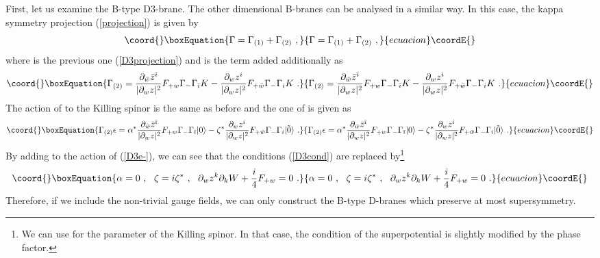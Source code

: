 \documentclass[a4paper,12pt]{article}
\numberwithin{equation}{section}
\providecommand{\ib}{\bar{\imath}}
\providecommand{\wb}{\bar{w}}
\providecommand{\zb}{\bar{z}}
\providecommand{\vac}{|0\rangle}
\providecommand{\vact}{|\tilde 0\rangle}
\begin{document}
First, let us examine the B-type D3-brane. The other dimensional B-branes
can be analysed in a similar way.
In this case, the kappa symmetry projection (\ref{projection}) is
given by 
\begin{equation}\coord{}\boxEquation{
\Gamma = \Gamma_{(1)} + \Gamma_{(2)} ~,
}{
\Gamma = \Gamma_{(1)} + \Gamma_{(2)} ~,
}{ecuacion}\coordE{}\end{equation}
where \coordHE{} is the previous one (\ref{D3projection})
and \coordHE{} is the term added additionally as
\begin{equation}\coord{}\boxEquation{
 \Gamma_{(2)} =  \frac{\partial_{\wb} \zb^{\ib}}
               {|\partial _w z|^2} F_{+ w} \Gamma_- \Gamma_{\ib}K
        - \frac{\partial_w z^i}
               {|\partial _w z|^2} F_{+\wb} \Gamma_- \Gamma_i K ~. 
}{
 \Gamma_{(2)} =  \frac{\partial_{\wb} \zb^{\ib}}
               {|\partial _w z|^2} F_{+ w} \Gamma_- \Gamma_{\ib}K
        - \frac{\partial_w z^i}
               {|\partial _w z|^2} F_{+\wb} \Gamma_- \Gamma_i K ~. 
}{ecuacion}\coordE{}\end{equation}
The action of \coordHE{} to the Killing spinor is the same as before
and the one of \coordHE{} is given as
\begin{equation}\coord{}\boxEquation{
 \Gamma_{(2)} \epsilon  = 
  \alpha^* \frac{\partial_{\wb} \zb^{\ib}}
               {|\partial _w z|^2} F_{+ w} \Gamma_- \Gamma_{\ib} \vac
 - \zeta^* \frac{\partial_w z^i}
               {|\partial _w z|^2} F_{+\wb} \Gamma_- \Gamma_i \vact ~.
}{
 \Gamma_{(2)} \epsilon  = 
  \alpha^* \frac{\partial_{\wb} \zb^{\ib}}
               {|\partial _w z|^2} F_{+ w} \Gamma_- \Gamma_{\ib} \vac
 - \zeta^* \frac{\partial_w z^i}
               {|\partial _w z|^2} F_{+\wb} \Gamma_- \Gamma_i \vact ~.
}{ecuacion}\coordE{}\end{equation}
By adding to the action of \coordHE{} (\ref{D3e-}),   
we can see that the conditions (\ref{D3cond}) are replaced by\footnote{
We can use \coordHE{} for the parameter of the
Killing spinor. In that case, the condition of the superpotential is
slightly modified by the phase factor.
}
\begin{equation}\coord{}\boxEquation{
 \alpha = 0 ~, ~~\zeta =  i \zeta^* ~,~~
 \partial_w z^k \partial_k W +  \frac{i}{4} F_{+w} =0 ~. 
\label{modD3}
}{
 \alpha = 0 ~, ~~\zeta =  i \zeta^* ~,~~
 \partial_w z^k \partial_k W +  \frac{i}{4} F_{+w} =0 ~. 
}{ecuacion}\coordE{}\end{equation}
Therefore, if we include the non-trivial gauge fields, we can only 
construct the B-type D-branes which preserve at most \coordHE{} supersymmetry.
\end{document}
